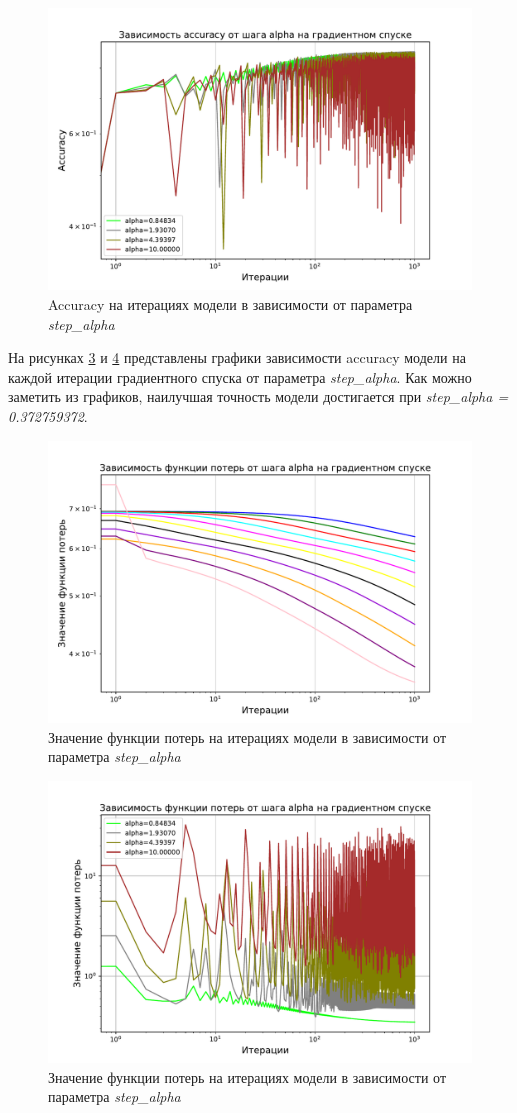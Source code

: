 \documentclass[14pt]{extarticle}
\begin{document}
\begin{figure}[H]
    \centering
    \includegraphics[width=0.7\linewidth]
    {exp_4_acc_alpha_2.pdf}
    \caption{Accuracy на итерациях модели в зависимости от параметра \textit{step\_alpha}}
    \label{fig:exp_4_acc_alpha_2}
\end{figure}

На рисунках \hyperref[fig:exp_4_acc_alpha_1]{3} и \hyperref[fig:exp_4_acc_alpha_2]{4} представлены графики зависимости accuracy модели на каждой итерации градиентного спуска от параметра \textit{step\_alpha}. Как можно заметить из графиков, наилучшая точность модели достигается при \textit{step\_alpha = 0.372759372}.

\begin{figure}[H]
    \centering
    \includegraphics[width=0.7\linewidth]
    {exp_4_loss_alpha_1.pdf}
    \caption{Значение функции потерь на итерациях модели в зависимости от параметра \textit{step\_alpha}}
    \label{fig:exp_4_loss_alpha_1}
\end{figure}

\begin{figure}[H]
    \centering
    \includegraphics[width=0.7\linewidth]
    {exp_4_loss_alpha_2.pdf}
    \caption{Значение функции потерь на итерациях модели в зависимости от параметра \textit{step\_alpha}}
    \label{fig:exp_4_loss_alpha_2}
\end{figure}
\end{document}
